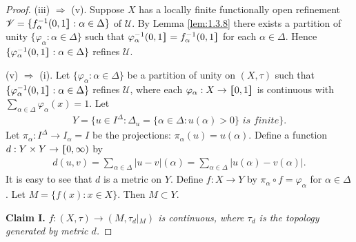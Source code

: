 \documentclass[main.tex]{subfiles}
\begin{document}
\begin{proof}
(iii) $\Rightarrow$ (v).
	Suppose $X$ has a locally finite functionally open 
	refinement $\mathscr{V} = \{f^{-1}_\alpha(0, 1\hstretch{1.8}{]}: \alpha \in \Delta\}$ of $\mathscr{U}$. 
	By Lemma \ref{lem:1.3.8} there exists a partition of unity 
	$\{\varphi_\alpha: \alpha \in \Delta\}$ 
	such that $\varphi_\alpha^{-1}(0, 1\hstretch{1.8}{]} = f_\alpha^{-1}(0, 1\hstretch{1.8}{]}$ 
	for each $\alpha \in \Delta$. 
	Hence $\{\varphi_\alpha^{-1}(0, 1\hstretch{1.8}{]}: \alpha \in \Delta\}$ refines $\mathscr{U}$.
	
(v) $\Rightarrow$ (i).
	Let $\{\varphi_\alpha: \alpha \in \Delta\}$ be a partition of unity on $(X, \tau)$ 
	such that $\{\varphi_\alpha^{-1}(0, 1\hstretch{1.8}{]}: \alpha \in \Delta\}$ refines $\mathscr{U}$, 
	where each $\varphi_\alpha: X \rightarrow \hstretch{1.8}{[}0, 1\hstretch{1.8}{]}$ is 
	continuous with $\sum_{\alpha \in \Delta} \varphi_\alpha(x) = 1$. 
Let
\begin{gather}
	Y = \{u \in I^\Delta: \Delta_u = \{\alpha \in \Delta: u(\alpha) > 0\} \textit{ is finite}\}.\label{eq:2.1.6.2}
\end{gather}
Let $\pi_\alpha: I^\Delta \rightarrow I_\alpha = I$ be the projections: 
	$\pi_\alpha(u) = u(\alpha)$. Define a function $d: Y \times Y \rightarrow \hstretch{1.8}{[}0, \infty)$ by
\begin{gather}
d(u, v) = \sum_{\alpha \in \Delta} \vert{}u - v\vert{}(\alpha) = 
	\sum_{\alpha \in \Delta} \vert{}u(\alpha) - v(\alpha)\vert{}. \label{eq:2.1.6.3}
\end{gather}
It is easy to see that $d$ is a metric on $Y$. Define $f: X \rightarrow Y$ 
	by $\pi_\alpha \circ f = \varphi_\alpha$ for $\alpha \in \Delta$. 
	Let $M = \{f(x): x \in X\}$. Then $M \subset Y$.
	
\textbf{Claim I.} \textit{$f: (X, \tau) \rightarrow (M, \tau_d\vert{}_M)$ is continuous, 
where $\tau_d$ is the topology generated by metric $d$.}
	

\end{proof}
\end{document}
